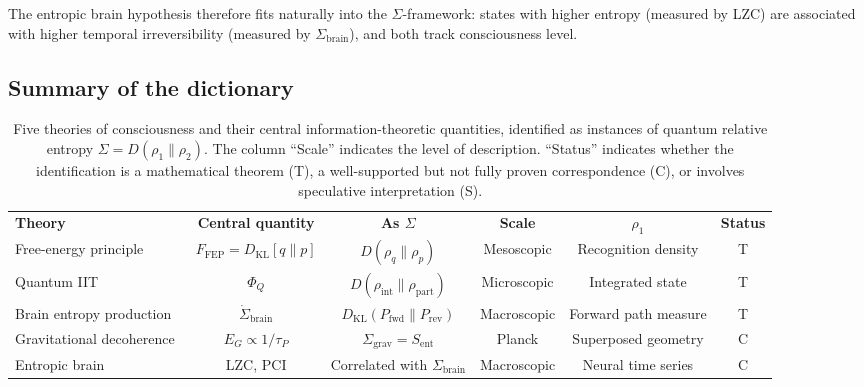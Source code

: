 \documentclass[prl,twocolumn,superscriptaddress,longbibliography,floatfix]{revtex4-2}
\newcommand{\Sbrain}{\Sigma_{\mathrm{brain}}}
\newcommand{\DKL}{D_{\mathrm{KL}}}
\newcommand{\Ffriston}{F_{\mathrm{FEP}}}
\begin{document}
The entropic brain hypothesis therefore fits naturally into the
$\Sigma$-framework: states with higher entropy (measured by LZC) are
associated with higher temporal irreversibility (measured by
$\Sbrain$), and both track consciousness level.

\subsection{Summary of the dictionary}
\label{subsec:summary_dict}

\begin{table}[t]
\centering
\caption{Five theories of consciousness and their central
information-theoretic quantities, identified as instances of
quantum relative entropy $\Sigma=D(\rho_1\|\rho_2)$.
The column ``Scale'' indicates the level of description.
``Status'' indicates whether the identification is a mathematical
theorem (T), a well-supported but not fully proven correspondence
(C), or involves speculative interpretation (S).}
\label{tab:unification}
\begin{ruledtabular}
\begin{tabular}{lccccc}
\textbf{Theory} & \textbf{Central quantity}
  & \textbf{As $\Sigma$} & \textbf{Scale}
  & \textbf{$\rho_1$} & \textbf{Status} \\
\colrule
Free-energy principle~\cite{Friston2019,Fields2022}
  & $\Ffriston = \DKL[q\|p]$
  & $D(\rho_q\|\rho_p)$
  & Mesoscopic
  & Recognition density
  & T \\
Quantum IIT~\cite{Zanardi2018,Albantakis2023Q}
  & $\Phi_Q$
  & $D(\rho_{\mathrm{int}}\|\rho_{\mathrm{part}})$
  & Microscopic
  & Integrated state
  & T \\
Brain entropy production~\cite{SanzPerl2021}
  & $\dot{\Sigma}_{\mathrm{brain}}$
  & $\DKL(P_{\mathrm{fwd}}\|P_{\mathrm{rev}})$
  & Macroscopic
  & Forward path measure
  & T \\
Gravitational decoherence~\cite{Penrose1996}
  & $E_G \propto 1/\tau_P$
  & $\Sigma_{\mathrm{grav}}=S_{\mathrm{ent}}$
  & Planck
  & Superposed geometry
  & C \\
Entropic brain~\cite{CarhartHarris2014}
  & LZC, PCI
  & Correlated with $\Sbrain$
  & Macroscopic
  & Neural time series
  & C \\
\end{tabular}
\end{ruledtabular}
\end{table}
\end{document}
